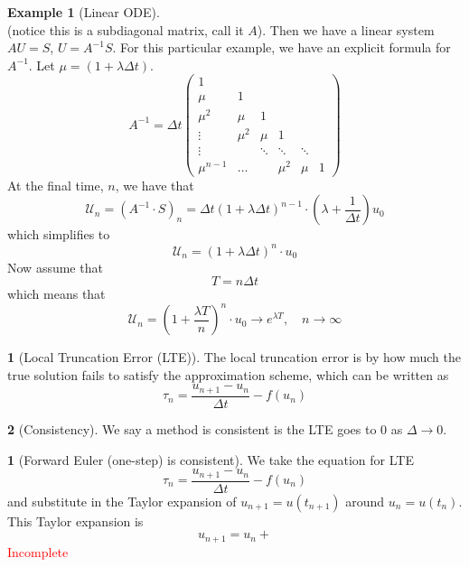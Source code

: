 \documentclass[12pt]{article}
\theoremstyle{definition}
\newtheorem{definition}{\color{NavyBlue}{\textbf{Definition}}}
\newtheorem{theorem}{\color{ForestGreen}{\textbf{Theorem}}}
\newcommand{\U}{\mathcal{U}}
\newtheorem{example}{\color{WildStrawberry}Example}
\theoremstyle{definition}
\begin{document}
\begin{example}[Linear ODE]
\begin{equation}
\end{equation}
(notice this is a subdiagonal matrix, call it $A$). Then we have a linear system $AU = S$, $U = A^{-1}S$. For this particular example, we have an explicit formula for $A^{-1}$. Let $\mu = \left(1 + \lambda \Delta t \right)$.
\begin{equation}
	A^{-1} = 
	\Delta t
	\begin{pmatrix}
	1 \\
	\mu & 1 \\
	\mu^2 & \mu & 1 \\
	\vdots & \mu^2 & \mu & 1 \\
	\vdots & & \ddots & \ddots &\ddots \\
	\mu^{n-1} &\hdots & &\mu^2 & \mu & 1
	\end{pmatrix}
\end{equation}
At the final time, $n$, we have that
\begin{equation}
	\U_n = (A^{-1} \cdot S)_n = \Delta t \left(1 + \lambda \Delta t \right)^{n-1} \cdot \left(\lambda + \frac{1}{\Delta t} \right) u_0
\end{equation}
which simplifies to
\begin{equation}
	\U_n = \left(1 + \lambda \Delta t \right)^{n} \cdot u_0
\end{equation}
Now assume that
\begin{equation}
	T = n \Delta t
\end{equation}
which means that
\begin{equation}
	\U_n = \left(1 + \frac{\lambda T}{n} \right)^{n} \cdot u_0 \to e^{\lambda T}, \quad n \to \infty
\end{equation}

\end{example}

\begin{definition}[Local Truncation Error (LTE)]
	The local truncation error is by how much the true solution fails to satisfy the approximation scheme, which can be written as
	\begin{equation}
		\tau_n = \frac{u_{n+1} - u_n}{\Delta t} - f(u_n)
	\end{equation}
\end{definition}

\begin{definition}[Consistency]
	We say a method is consistent is the LTE goes to 0 as $\Delta \to 0$.
\end{definition}

\begin{theorem}[Forward Euler (one-step) is consistent]
	We take the equation for LTE 
	\begin{equation}
		\tau_n = \frac{u_{n+1} - u_n}{\Delta t} - f(u_n)
	\end{equation}
	and substitute in the Taylor expansion of $u_{n+1} = u(t_{n+1})$ around $u_n = u(t_n)$. This Taylor expansion is
	\begin{equation}
		u_{n+1} = u_n + 
	\end{equation}
	\textcolor{red}{Incomplete}
\end{theorem}
\end{document}

